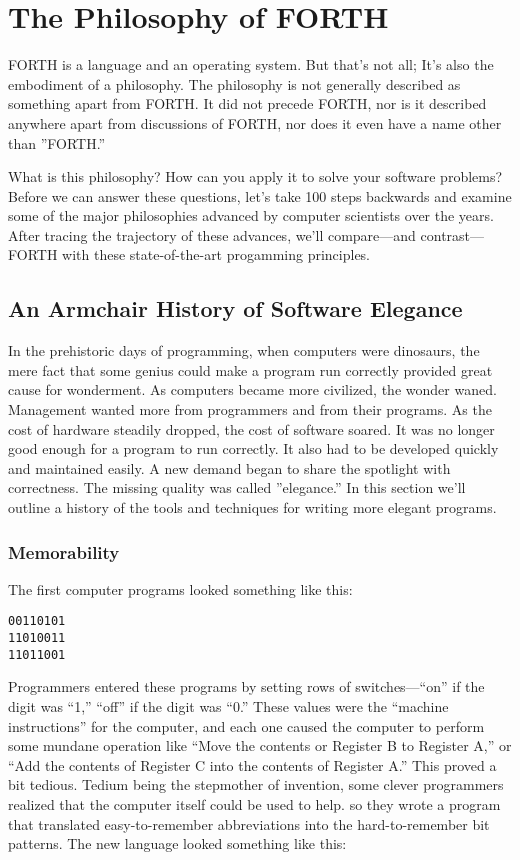 \chapter{The Philosophy of FORTH}


FORTH is a language and an operating system. But that's not all; It's
also the embodiment of a philosophy. The philosophy is not generally
described as something apart from FORTH. It did not precede FORTH,
nor is it described anywhere apart from discussions of FORTH, nor
does it even have a name other than ''FORTH.''

What is this philosophy? How can you apply it to solve your software
problems? Before we can answer these questions, let's take 100 steps
backwards and examine some of the major philosophies advanced by computer
scientists over the years. After tracing the trajectory of these advances,
we'll compare---and contrast---FORTH with these state-of-the-art progamming
principles.


\section{An Armchair History of Software Elegance}

In the prehistoric days of programming, when computers were dinosaurs,
the mere fact that some genius could make a program run correctly
provided great cause for wonderment. As computers became more civilized,
the wonder waned. Management wanted more from programmers and from
their programs. As the cost of hardware steadily dropped, the cost
of software soared. It was no longer good enough for a program to
run correctly. It also had to be developed quickly and maintained
easily. A new demand began to share the spotlight with correctness.
The missing quality was called ''elegance.'' In this section we'll
outline a history of the tools and techniques for writing more elegant
programs.


\subsection{Memorability}

The first computer programs looked something like this:

\begin{verbatim}
00110101
11010011
11011001
\end{verbatim}
Programmers entered these programs by setting rows of switches---``on''
if the digit was {}``1,'' ``off'' if the digit was ``0.'' These
values were the {}``machine instructions'' for the computer, and
each one caused the computer to perform some mundane operation like
``Move the contents or Register B to Register A,'' or {}``Add the
contents of Register C into the contents of Register A.'' This proved
a bit tedious. Tedium being the stepmother of invention, some clever
programmers realized that the computer itself could be used to help.
so they wrote a program that translated easy-to-remember abbreviations
into the hard-to-remember bit patterns. The new language looked something
like this:

